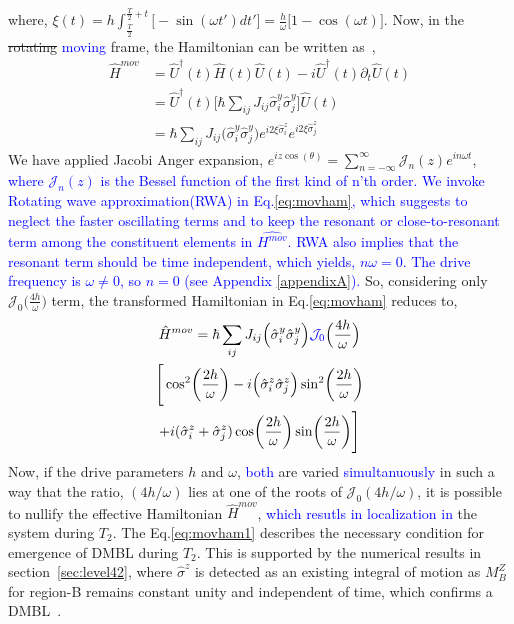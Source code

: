 \documentclass[%
reprint,
superscriptaddress,
amsmath,amssymb,showkeys,
aps,
prb,
]{revtex4-2}
\newcommand{\blue}[1]{\textcolor{blue}{#1}}
\begin{document}
	where, $\displaystyle{
		\xi (t) = h\int_{\frac{T}{2}}^{\frac{T}{2}+t}  \Big[-\sin(\omega t')dt'\Big]=  \frac{h}{\omega}\Big[1-\cos(\omega t)\Big]}$.		
	Now, in the \sout{rotating} \blue{moving} frame, the Hamiltonian can be written as~\cite{haldar_dynamical_2021},
	\begin{align}
		\hat{H}^{mov} &= \hat{U}^\dagger(t) \hat{H}(t) \hat{U}(t)- i \hat{U}^\dagger(t) \partial_t \hat{U}(t)\nonumber\\
		&= \hat{U}^\dagger(t) \big[\hbar\sum_{ij}J_{ij}\hat{\sigma}^y_i\hat{\sigma}^y_j\big] \hat{U}(t)\nonumber\\
		&=\hbar\sum_{ij} J_{ij} \Big(\hat{\sigma}^y_i\hat{\sigma}^y_j\Big) e^{i 2\xi \hat{\sigma}^z_i}  e^{i 2\xi \hat{\sigma}^z_j}
		\label{eq:movham}
	\end{align}
	We have applied Jacobi Anger expansion, $\displaystyle e^{iz \cos(\theta)} = \sum_{n=-\infty}^{\infty} \mathcal{J}_n(z) e^{in\omega t}$, \blue{where $\mathcal{J}_n(z)$ is the Bessel function of the first kind of n'th order. We invoke Rotating wave approximation(RWA)\cite{das_exotic_2010, Ashhab2007, Kiely2018, haldar_dynamical_2017,fuji2017} in Eq.\eqref{eq:movham}, which suggests to neglect the faster oscillating terms and to keep the resonant or close-to-resonant term among the constituent elements in $\hat{H^{mov}}$. RWA also implies that the resonant term should be time independent\cite{Ashhab2007, das_exotic_2010}, which yields, $n\omega = 0$. The drive frequency is $\omega\neq 0$, so $n=0$ (see Appendix \ref{appendixA}). }  So, considering only $\mathcal{J}_0\big(\frac{4h}{\omega}\big)$ term, the transformed Hamiltonian in Eq.\eqref{eq:movham} reduces to,
	\begin{multline}
		\hat{H}^{mov} =\hbar \sum_{ij} J_{ij} \Big(\hat{\sigma}^y_i\hat{\sigma}^y_j\Big)\blue{\mathcal{J}_0}\Big(\frac{4h}{\omega}\Big) \\\Bigg[\cos[2](\frac{2h}{\omega}) -i\Big(\hat{\sigma}^z_i\hat{\sigma}^z_j\Big) \sin[2](\frac{2h}{\omega})\\+ i (\hat{\sigma}^z_i + \hat{\sigma}^z_j)\cos(\frac{2h}{\omega})\sin(\frac{2h}{\omega})\Bigg]
		\label{eq:movham1}
	\end{multline}
	Now, if the drive parameters $h$ and $\omega$, \blue{both}  are varied \blue{simultanuously} in such a way that the ratio, $({4h}/{\omega})$ lies at one of the roots of $\mathcal{J}_0(4h/\omega)$, it is possible to nullify the effective Hamiltonian $\hat{H}^{mov}$, \blue{which resutls in localization in} the system during $T_2$. The Eq.\eqref{eq:movham1} describes the necessary condition for emergence of DMBL during $T_2$. This is supported by the numerical results in section~\ref{sec:level42}, where $\hat{\sigma}^z$ is detected as an existing integral of motion as $M^Z_B$ for region-B remains constant unity and independent of time, which confirms a DMBL~\cite{Keser2016,Dodonov1978}. 
	
\end{document}
